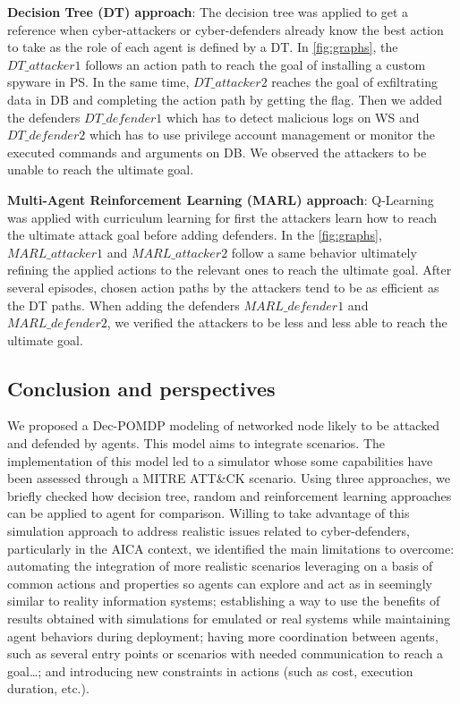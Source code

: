\noindent
\textbf{Decision Tree (DT) approach}: \quad The decision tree was applied to get a reference when cyber-attackers or cyber-defenders already know the best action to take as the role of each agent is defined by a DT.
In \autoref{fig:graphs}, the $DT\_attacker1$ follows an action path to reach the goal of installing a custom spyware in PS. In the same time, $DT\_attacker2$ reaches the goal of exfiltrating data in DB and completing the action path by getting the flag. Then we added the defenders $DT\_defender1$ which has to detect malicious logs on WS and $DT\_defender2$ which has to use privilege account management or monitor the executed commands and arguments on DB. We observed the attackers to be unable to reach the ultimate goal.

\noindent
\textbf{Multi-Agent Reinforcement Learning (MARL) approach}: \quad Q-Learning~\cite{CWatkins1992} was applied with curriculum learning for first the attackers learn how to reach the ultimate attack goal before adding defenders.
In the \autoref{fig:graphs}, $MARL\_attacker1$ and $MARL\_attacker2$ follow a same behavior ultimately refining the applied actions to the relevant ones to reach the ultimate goal. After several episodes, chosen action paths by the attackers tend to be as efficient as the DT paths. When adding the defenders $MARL\_defender1$ and $MARL\_defender2$, we verified the attackers to be less and less able to reach the ultimate goal.


\subsection{Conclusion and perspectives}

\noindent
We proposed a Dec-POMDP modeling of networked node likely to be attacked and defended by agents. This model aims to integrate scenarios. The implementation of this model led to a simulator whose some capabilities have been assessed through a MITRE ATT\&CK scenario. Using three approaches, we briefly checked how decision tree, random and reinforcement learning approaches can be applied to agent for comparison.
Willing to take advantage of this simulation approach to address realistic issues related to cyber-defenders, particularly in the AICA context, we identified the main limitations to overcome:
automating the integration of more realistic scenarios leveraging on a basis of common actions and properties so agents can explore and act as in seemingly similar to reality information systems;
establishing a way to use the benefits of results obtained with simulations for emulated or real systems while maintaining agent behaviors during deployment;
having more coordination between agents, such as several entry points or scenarios with needed communication to reach a goal\dots;
and introducing new constraints in actions (such as cost, execution duration, etc.).